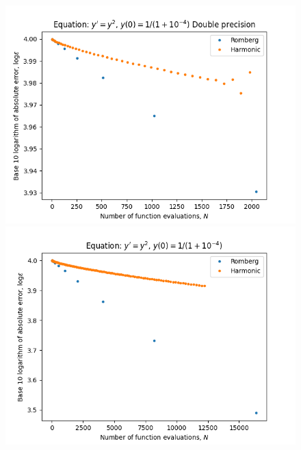\begin{figure}[H]
\centering
\begin{minipage}{0.45\textwidth}
\centering
\includegraphics[scale=0.45]{../results/emr_plots/singularity_4.png}
\end{minipage}
\begin{minipage}{0.45\textwidth}
\centering
\includegraphics[scale=0.45]{../results/emr_plots/singularity_4_hp.png}
\end{minipage}
\end{figure}

